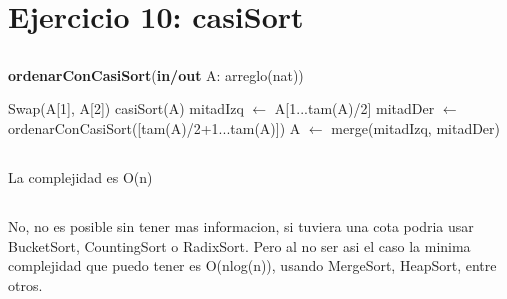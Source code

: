 \section{Ejercicio 10: casiSort}

\subsection{}
\begin{algorithm}[H]
\caption{
    \textbf{ordenarConCasiSort}(\textbf{in/out} A: arreglo(nat))
}
    \begin{algorithmic}[1]
                \State Swap(A[1], A[2])
            \EndIf
        \Else
            \State casiSort(A) 
            \State mitadIzq $\gets$ A[1...tam(A)/2] 
            \State mitadDer $\gets$ ordenarConCasiSort([tam(A)/2+1...tam(A)]) 
            \State A $\gets$ merge(mitadIzq, mitadDer) 
        \EndIf
    \end{algorithmic}
\end{algorithm}

\subsection{}
La complejidad es O(n)

\subsection{}
No, no es posible sin tener mas informacion, si tuviera una cota podria usar BucketSort, CountingSort o RadixSort. Pero al no ser asi el caso la minima complejidad que puedo tener es O(nlog(n)), usando MergeSort, HeapSort, entre otros.
